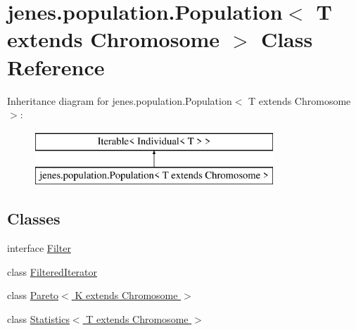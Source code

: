 \hypertarget{classjenes_1_1population_1_1_population_3_01_t_01extends_01_chromosome_01_4}{\section{jenes.\-population.\-Population$<$ T extends Chromosome $>$ Class Reference}
\label{classjenes_1_1population_1_1_population_3_01_t_01extends_01_chromosome_01_4}
}
Inheritance diagram for jenes.\-population.\-Population$<$ T extends Chromosome $>$\-:\begin{figure}[H]
\begin{center}
\leavevmode
\includegraphics[height=2.000000cm]{classjenes_1_1population_1_1_population_3_01_t_01extends_01_chromosome_01_4}
\end{center}
\end{figure}
\subsection*{Classes}
\begin{DoxyCompactItemize}
\item 
interface \hyperlink{interfacejenes_1_1population_1_1_population_3_01_t_01extends_01_chromosome_01_4_1_1_filter}{Filter}
\item 
class \hyperlink{classjenes_1_1population_1_1_population_3_01_t_01extends_01_chromosome_01_4_1_1_filtered_iterator}{Filtered\-Iterator}
\item 
class \hyperlink{classjenes_1_1population_1_1_population_3_01_t_01extends_01_chromosome_01_4_1_1_pareto_3_01_k_01extends_01_chromosome_01_4}{Pareto$<$ K extends Chromosome $>$}
\item 
class \hyperlink{classjenes_1_1population_1_1_population_3_01_t_01extends_01_chromosome_01_4_1_1_statistics_3_01_t_01extends_01_chromosome_01_4}{Statistics$<$ T extends Chromosome $>$}
\end{DoxyCompactItemize}
